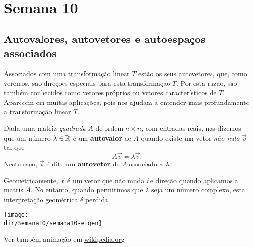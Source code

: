 \documentclass[../livro.tex]{subfiles}  %
\providecommand{\dir}{..}
\begin{document}
\chapter{Semana 10}


\section{Autovalores, autovetores e autoespaços associados}

Associados com uma transformação linear $T$ estão os seus autovetores, que, como veremos, são direções especiais para esta transformação $T$. Por esta razão, são também conhecidos como vetores próprios ou vetores característicos de $T$. Aparecem em muitas aplicações, pois nos ajudam a entender mais profundamente a transformação linear $T$.

Dada uma matriz \textit{quadrada} $A$ de ordem $n \times n$, com entradas reais, nós dizemos que um número $\lambda \in \mathbb{R}$ é um \textbf{autovalor} de $A$ quando existe um vetor \textit{não nulo} $\vec{v}$ tal que
\[
A \vec{v} = \lambda \vec{v}.
\] Neste caso, $\vec{v}$ é dito um \textbf{autovetor} de $A$ associado a $\lambda$.

Geometricamente, $\vec{v}$ é um vetor que não muda de direção quando aplicamos a matriz $A$. No entanto, quando permitimos que $\lambda$ seja um número complexo, esta interpretação geométrica é perdida.

		\texttt{[image: \\dir/Semana10/semana10-eigen]}

\noindent Ver também animação em \href{https://en.wikipedia.org/wiki/Eigenvalues_and_eigenvectors#Matrix_examples}{wikipedia.org}
\end{document}
